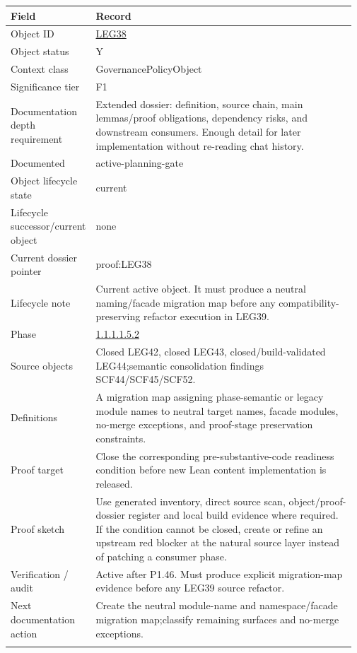 \begin{longtable}{L{0.16\linewidth} L{0.81\linewidth}}
\hline
\textbf{Field} & \textbf{Record}\\
\hline
Object ID & \hyperlink{object-row-LEG38}{LEG38}\\
\hline\addlinespace[0.20em]
Object status & Y\\
\hline\addlinespace[0.20em]
Context class & GovernancePolicyObject\\
\hline\addlinespace[0.20em]
Significance tier & F1\\
\hline\addlinespace[0.20em]
Documentation depth requirement & Extended dossier: definition, source chain, main lemmas/\allowbreak{}proof obligations, dependency risks, and downstream consumers. Enough detail for later implementation without re-reading chat history.\\
\hline\addlinespace[0.20em]
Documented & active-planning-gate\\
\hline\addlinespace[0.20em]
Object lifecycle state & current\\
\hline\addlinespace[0.20em]
Lifecycle successor/\allowbreak{}current object & none\\
\hline\addlinespace[0.20em]
Current dossier pointer & proof:LEG38\\
\hline\addlinespace[0.20em]
Lifecycle note & Current active object. It must produce a neutral naming/\allowbreak{}facade migration map before any compatibility-preserving refactor execution in LEG39.\\
\hline\addlinespace[0.20em]
Phase & \hyperlink{phase-row-1-1-1-1-5-2}{1.1.1.1.5.2}\\
\hline\addlinespace[0.20em]
Source objects & Closed LEG42, closed LEG43, closed/\allowbreak{}build-validated LEG44;\newline semantic consolidation findings SCF44/\allowbreak{}SCF45/\allowbreak{}SCF52.\\
\hline\addlinespace[0.20em]
Definitions & A migration map assigning phase-semantic or legacy module names to neutral target names, facade modules, no-merge exceptions, and proof-stage preservation constraints.\\
\hline\addlinespace[0.20em]
Proof target & Close the corresponding pre-substantive-code readiness condition before new Lean content implementation is released.\\
\hline\addlinespace[0.20em]
Proof sketch & Use generated inventory, direct source scan, object/\allowbreak{}proof-dossier register and local build evidence where required. If the condition cannot be closed, create or refine an upstream red blocker at the natural source layer instead of patching a consumer phase.\\
\hline\addlinespace[0.20em]
Verification /\allowbreak{} audit & Active after P1.46. Must produce explicit migration-map evidence before any LEG39 source refactor.\\
\hline\addlinespace[0.20em]
Next documentation action & Create the neutral module-name and namespace/\allowbreak{}facade migration map;\newline classify remaining surfaces and no-merge exceptions.\\
\hline\addlinespace[0.20em]
\end{longtable}
